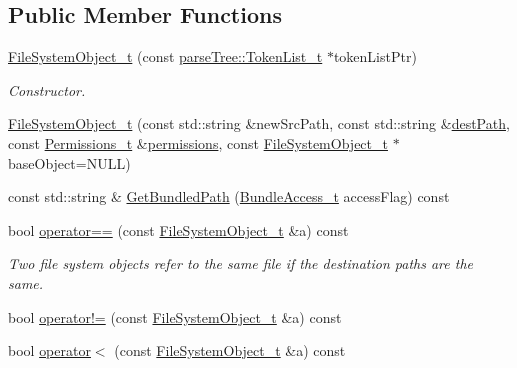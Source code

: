 \subsection*{Public Member Functions}
\begin{DoxyCompactItemize}
\item 
\hyperlink{structmodel_1_1_file_system_object__t_a04036627e1736a9014a252b6ed4ff85c}{File\+System\+Object\+\_\+t} (const \hyperlink{structparse_tree_1_1_token_list__t}{parse\+Tree\+::\+Token\+List\+\_\+t} $\ast$token\+List\+Ptr)
\begin{DoxyCompactList}\small\item\em Constructor. \end{DoxyCompactList}\item 
\hyperlink{structmodel_1_1_file_system_object__t_a472e0c3219c052562d69463a3b0e1b6e}{File\+System\+Object\+\_\+t} (const std\+::string \&new\+Src\+Path, const std\+::string \&\hyperlink{structmodel_1_1_file_system_object__t_a25f1ec1e11afaf82005c2c6b021a3925}{dest\+Path}, const \hyperlink{structmodel_1_1_permissions__t}{Permissions\+\_\+t} \&\hyperlink{structmodel_1_1_file_system_object__t_a9e021ff0837eec52c07ea6805e0e79e5}{permissions}, const \hyperlink{structmodel_1_1_file_system_object__t}{File\+System\+Object\+\_\+t} $\ast$base\+Object=N\+U\+LL)
\item 
const std\+::string \& \hyperlink{structmodel_1_1_file_system_object__t_ab6d86e0e729074b8d14d3bde2a6ffe65}{Get\+Bundled\+Path} (\hyperlink{namespacemodel_a026dbfd7d63730bfdbca3403cd1d5d1d}{Bundle\+Access\+\_\+t} access\+Flag) const 
\item 
bool \hyperlink{structmodel_1_1_file_system_object__t_adbc0175708d37182714f4b9f40d22e09}{operator==} (const \hyperlink{structmodel_1_1_file_system_object__t}{File\+System\+Object\+\_\+t} \&a) const 
\begin{DoxyCompactList}\small\item\em Two file system objects refer to the same file if the destination paths are the same. \end{DoxyCompactList}\item 
bool \hyperlink{structmodel_1_1_file_system_object__t_a3d2a80e0df493e353319a7ea6ef25c16}{operator!=} (const \hyperlink{structmodel_1_1_file_system_object__t}{File\+System\+Object\+\_\+t} \&a) const 
\item 
bool \hyperlink{structmodel_1_1_file_system_object__t_a5fde7d8d28918835bf098b6b2c8ba763}{operator$<$} (const \hyperlink{structmodel_1_1_file_system_object__t}{File\+System\+Object\+\_\+t} \&a) const 

\end{DoxyCompactItemize}
